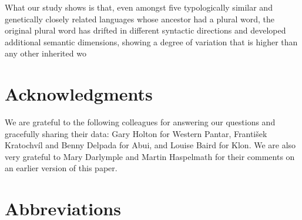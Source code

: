 What our study shows is that, even amongst five typologically similar and genetically closely related languages whose ancestor had a plural word, the original plural word has drifted in different syntactic directions and developed additional semantic dimensions, showing a degree of variation that is higher than any other inherited wo


\section*{Acknowledgments}
We are grateful to the following colleagues for answering our questions and gracefully sharing their data: Gary Holton for Western Pantar, Franti\v{s}ek Kratochv\'il and Benny Delpada for Abui, and Louise Baird for Klon. We are also very grateful to Mary Darlymple and Martin Haspelmath for their comments on an earlier version of this paper.



\section*{Abbreviations}


